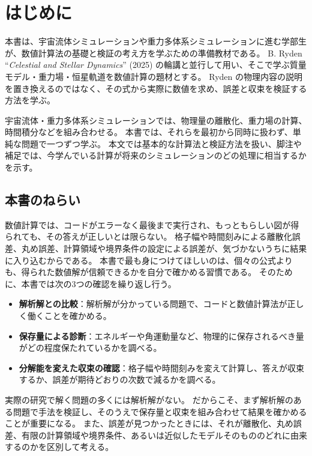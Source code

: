 \chapter*{はじめに}

本書は、宇宙流体シミュレーションや重力多体系シミュレーションに進む学部生が、数値計算法の基礎と検証の考え方を学ぶための準備教材である。
B. Ryden ``\textit{Celestial and Stellar Dynamics}'' (2025) の輪講と並行して用い、そこで学ぶ質量モデル・重力場・恒星軌道を数値計算の題材とする。
Ryden の物理内容の説明を置き換えるのではなく、その式から実際に数値を求め、誤差と収束を検証する方法を学ぶ。

宇宙流体・重力多体系シミュレーションでは、物理量の離散化、重力場の計算、時間積分などを組み合わせる。
本書では、それらを最初から同時に扱わず、単純な問題で一つずつ学ぶ。
本文では基本的な計算法と検証方法を扱い、脚注や補足では、今学んでいる計算が将来のシミュレーションのどの処理に相当するかを示す。

\section*{本書のねらい}

数値計算では、コードがエラーなく最後まで実行され、もっともらしい図が得られても、その答えが正しいとは限らない。
格子幅や時間刻みによる離散化誤差、丸め誤差、計算領域や境界条件の設定による誤差が、気づかないうちに結果に入り込むからである。
本書で最も身につけてほしいのは、個々の公式よりも、得られた数値解が信頼できるかを自分で確かめる習慣である。
そのために、本書では次の3つの確認を繰り返し行う。

\begin{itemize}
  \item \textbf{解析解との比較}：解析解が分かっている問題で、コードと数値計算法が正しく働くことを確かめる。
  \item \textbf{保存量による診断}：エネルギーや角運動量など、物理的に保存されるべき量がどの程度保たれているかを調べる。
  \item \textbf{分解能を変えた収束の確認}：格子幅や時間刻みを変えて計算し、答えが収束するか、誤差が期待どおりの次数で減るかを調べる。
\end{itemize}

実際の研究で解く問題の多くには解析解がない。
だからこそ、まず解析解のある問題で手法を検証し、そのうえで保存量と収束を組み合わせて結果を確かめることが重要になる。
また、誤差が見つかったときには、それが離散化、丸め誤差、有限の計算領域や境界条件、あるいは近似したモデルそのもののどれに由来するのかを区別して考える。

